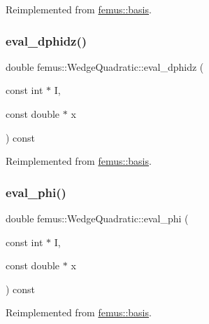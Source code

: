 Reimplemented from \mbox{\hyperlink{classfemus_1_1basis_a2819fac9aae797156b9efec8a0b85cc1}{femus\+::basis}}.

\mbox{\label{classfemus_1_1_wedge_quadratic_a7136bf2e3368d20821306b56ce653752}} 
\subsubsection{\texorpdfstring{eval\+\_\+dphidz()}{eval\_dphidz()}}
{\footnotesize\ttfamily double femus\+::\+Wedge\+Quadratic\+::eval\+\_\+dphidz (\begin{DoxyParamCaption}\item[{const int $\ast$}]{I,  }\item[{const double $\ast$}]{x }\end{DoxyParamCaption}) const\hspace{0.3cm}{\ttfamily [virtual]}}



Reimplemented from \mbox{\hyperlink{classfemus_1_1basis_affd9927f6e25e264108219d862b8cb3d}{femus\+::basis}}.

\mbox{\label{classfemus_1_1_wedge_quadratic_a3b26fb7ddecdce25a52fd79cdff35c3f}} 
\subsubsection{\texorpdfstring{eval\+\_\+phi()}{eval\_phi()}}
{\footnotesize\ttfamily double femus\+::\+Wedge\+Quadratic\+::eval\+\_\+phi (\begin{DoxyParamCaption}\item[{const int $\ast$}]{I,  }\item[{const double $\ast$}]{x }\end{DoxyParamCaption}) const\hspace{0.3cm}{\ttfamily [virtual]}}



Reimplemented from \mbox{\hyperlink{classfemus_1_1basis_a89b0797cdccffae5ff6d059b32016ae5}{femus\+::basis}}.

